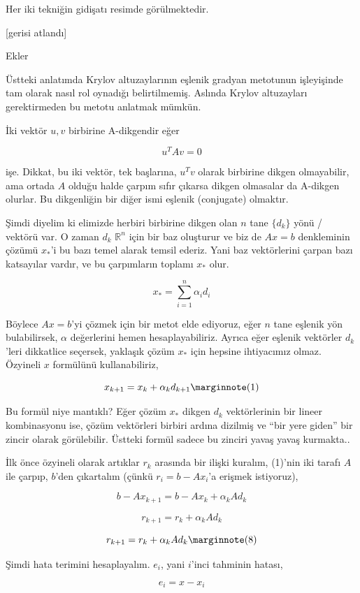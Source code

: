 \documentclass[12pt,fleqn]{article}\usepackage{../../common}
\begin{document}
Her iki tekniğin gidişatı resimde görülmektedir. 

[gerisi atlandı]

Ekler 

Üstteki anlatımda Krylov altuzaylarının eşlenik gradyan metotunun
işleyişinde tam olarak nasıl rol oynadığı belirtilmemiş. Aslında Krylov
altuzayları gerektirmeden bu metotu anlatmak mümkün. 

İki vektör $u,v$ birbirine A-dikgendir eğer

$$ u^TAv = 0 $$ 

işe. Dikkat, bu iki vektör, tek başlarına, $u^Tv$ olarak birbirine
dikgen olmayabilir, ama ortada $A$ olduğu halde çarpım sıfır çıkarsa
dikgen olmasalar da A-dikgen olurlar. Bu dikgenliğin bir diğer
ismi eşlenik (conjugate) olmaktır.

Şimdi diyelim ki elimizde herbiri birbirine dikgen olan $n$ tane
$\{d_k\}$ yönü / vektörü var. O zaman $d_k$ $\mathbb{R}^n$ için bir baz
oluşturur ve biz de $Ax = b$ denkleminin çözümü $x_*$'i bu bazı temel
alarak temsil ederiz. Yani baz vektörlerini çarpan bazı katsayılar vardır,
ve bu çarpımların toplamı $x_*$ olur. 

$$ x_* = \sum _{ i=1}^{n} \alpha_i d_i $$

Böylece $Ax = b$'yi çözmek için bir metot elde ediyoruz, eğer $n$ tane
eşlenik yön bulabilirsek, $\alpha$ değerlerini hemen hesaplayabiliriz.
Ayrıca eğer eşlenik vektörler $d_k$'leri dikkatlice seçersek, yaklaşık çözüm $x_*$
için hepsine ihtiyacımız olmaz. Özyineli $x$ formülünü kullanabiliriz,

$$
x_{k+1} = x_k + \alpha_k d_{k+1} 
\mlabel{1}
$$

Bu formül niye mantıklı? Eğer çözüm $x_*$ dikgen $d_k$ vektörlerinin bir
lineer kombinasyonu ise, çözüm vektörleri birbiri ardına dizilmiş ve ``bir
yere giden'' bir zincir olarak görülebilir. Üstteki formül sadece bu
zinciri yavaş yavaş kurmakta..

İlk önce özyineli olarak artıklar $r_k$ arasında bir ilişki kuralım,
(1)'nin iki tarafı $A$ ile çarpıp, $b$'den çıkartalım (çünkü
$r_i = b - Ax_i$'a erişmek istiyoruz),

$$b - A x_{k+1} = b - A x_k  + \alpha_k A d_{k} $$

$$r_{k+1} = r_k + \alpha_k A d_{k} $$

$$
r_{k+1} = r_k + \alpha_k A d_{k} 
\mlabel{8}
$$

Şimdi hata terimini hesaplayalım. $e_i$, yani $i$'inci tahminin hatası, 

$$ e_i = x - x_i  $$
\end{document}

